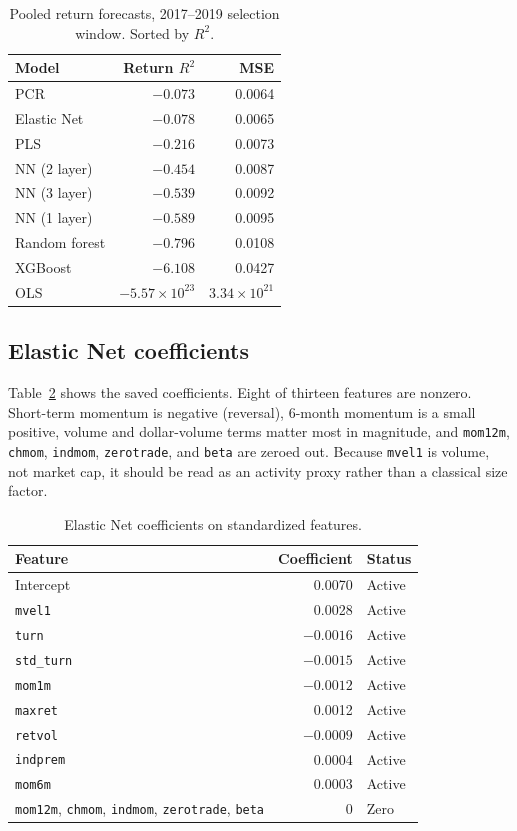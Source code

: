 \documentclass[11pt,twocolumn]{article}
\begin{document}
\begin{table}[t]
\centering
\caption{Pooled return forecasts, 2017--2019 selection window. Sorted by $R^2$.}
\label{table:model_selection}
\begin{tabular*}{\columnwidth}{l @{\extracolsep{\fill}} rr}
\toprule
\textbf{Model} & \textbf{Return $R^2$} & \textbf{MSE} \\
\midrule
PCR & $-0.073$ & 0.0064 \\
Elastic Net & $-0.078$ & 0.0065 \\
PLS & $-0.216$ & 0.0073 \\
NN (2 layer) & $-0.454$ & 0.0087 \\
NN (3 layer) & $-0.539$ & 0.0092 \\
NN (1 layer) & $-0.589$ & 0.0095 \\
Random forest & $-0.796$ & 0.0108 \\
XGBoost & $-6.108$ & 0.0427 \\
OLS & $-5.57\times10^{23}$ & $3.34\times10^{21}$ \\
\bottomrule
\end{tabular*}
\end{table}

\subsection{Elastic Net coefficients}

Table~\ref{table:coefficients} shows the saved coefficients. Eight of thirteen features are nonzero. Short-term momentum is negative (reversal), 6-month momentum is a small positive, volume and dollar-volume terms matter most in magnitude, and \texttt{mom12m}, \texttt{chmom}, \texttt{indmom}, \texttt{zerotrade}, and \texttt{beta} are zeroed out. Because \texttt{mvel1} is volume, not market cap, it should be read as an activity proxy rather than a classical size factor.

\begin{table}[t]
\centering
\caption{Elastic Net coefficients on standardized features.}
\label{table:coefficients}
\begin{tabular}{lrl}
\toprule
\textbf{Feature} & \textbf{Coefficient} & \textbf{Status} \\
\midrule
Intercept & 0.0070 & Active \\
\texttt{mvel1} & 0.0028 & Active \\
\texttt{turn} & $-0.0016$ & Active \\
\texttt{std\_turn} & $-0.0015$ & Active \\
\texttt{mom1m} & $-0.0012$ & Active \\
\texttt{maxret} & 0.0012 & Active \\
\texttt{retvol} & $-0.0009$ & Active \\
\texttt{indprem} & 0.0004 & Active \\
\texttt{mom6m} & 0.0003 & Active \\
\texttt{mom12m}, \texttt{chmom}, \texttt{indmom}, \texttt{zerotrade}, \texttt{beta} & 0 & Zero \\
\bottomrule
\end{tabular}
\end{table}
\end{document}
